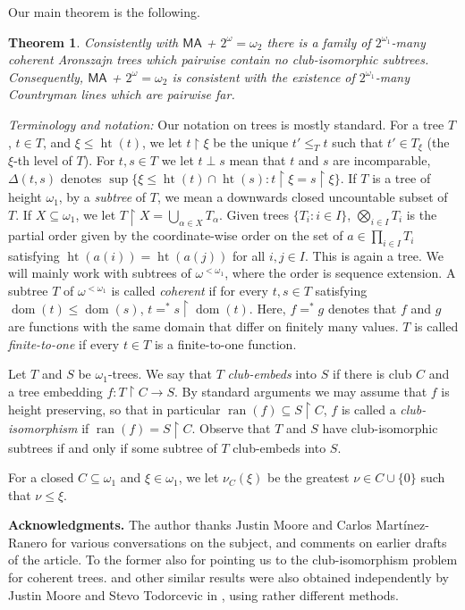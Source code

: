 \documentclass[a4paper,noamsfonts]{amsart}
\newtheorem{maintheorem}{Theorem}
\theoremstyle{definition}
\newcommand{\seb}{\subseteq}
\newcommand{\res}{\!\upharpoonright\!}
\newcommand{\MA}{\textsf{MA}}
\newcommand{\1}{\mathbf{1}}
\DeclareMathOperator{\dom}{dom}
\DeclareMathOperator{\ran}{ran}
\DeclareMathOperator{\hht}{ht}
\begin{document}
Our main theorem is the following.

\begin{maintheorem}\label{thm:main}
  Consistently with $\MA$ + $2^{\omega} = \omega_{2}$ there is a family of
  $2^{\omega_{1}}$-many coherent Aronszajn trees
  which pairwise contain no club-isomorphic subtrees.
  Consequently,
  $\MA$ + $2^{\omega} = \omega_{2}$ is consistent with the existence of
  $2^{\omega_{1}}$-many Countryman lines which are pairwise far.
\end{maintheorem}

\noindent\emph{Terminology and notation:} Our notation on trees is mostly
standard. For a tree $T$, $t \in T$, and $\xi \le \hht(t)$,
we let $t\res \xi$ be the unique $t' \le_{T} t$ such that
$t' \in T_{\xi}$ (the $\xi$-th level of
$T$). For $t,s \in T$ we let $t \perp s$ mean
that $t$ and $s$ are incomparable,
$\Delta(t,s)$ denotes $\sup\{\xi \le \hht(t)\cap\hht(s)
: t\res \xi = s \res \xi\}$.
If $T$ is a tree of height $\omega_{1}$, by a \emph{subtree} of $T$,
we mean a downwards closed uncountable subset of $T$. If $X \seb \omega_{1}$,
we let $T \res X = \bigcup_{\alpha \in X}T_{\alpha}$.
Given
trees $\{T_{i} : i \in I\}$, $\bigotimes_{i \in I}T_{i}$ is the
partial order given by the coordinate-wise order on the set of $a \in
\prod_{i \in I}T_{i}$ satisfying $\hht(a(i)) = \hht(a(j))$ for all $i,j \in I$.
This is again a tree.
We will mainly work with subtrees of
$\omega^{<\omega_{1}}$, where the order is sequence extension. A subtree $T$ of
$\omega^{<\omega_{1}}$ is called \emph{coherent} if for every $t,s \in
T$ satisfying $\dom(t) \le \dom(s)$, $t =^{*} s\res\dom(t)$. Here,
$f =^{*} g$ denotes that $f$ and $g$ are functions with the same domain
that differ on finitely many values. $T$
is called \emph{finite-to-one} if every $t \in T$ is a finite-to-one
function.

Let $T$ and $S$ be $\omega_{1}$-trees. We say that $T$ \emph{club-embeds}
into $S$ if there is club $C$ and a tree embedding $f : T \res C \to S$.
By standard arguments we may assume that $f$ is height preserving,
so that in particular $\ran(f) \seb S \res C$, $f$ is called
a \emph{club-isomorphism} if $\ran(f) = S \res C$. Observe that $T$ and
$S$ have club-isomorphic subtrees if and only if some subtree of $T$
club-embeds into $S$.

For a closed $C \seb \omega_{1}$ and $\xi \in \omega_{1}$,
we let $\nu_{C}(\xi)$ be the greatest
$\nu \in C \cup \{0\}$ such that $\nu \le \xi$.

\bigskip
\noindent \textbf{Acknowledgments.}
The author thanks Justin Moore and Carlos Martínez-Ranero for various
conversations on the subject, and comments on earlier drafts of the
article. To the former also for pointing us to the club-isomorphism
problem for coherent trees.  and other similar results
were also obtained independently by Justin Moore and Stevo Todorcevic
in \cite{MooreTodorcevic}, using rather different methods.
\end{document}
